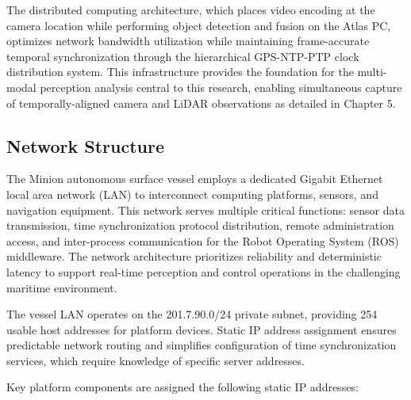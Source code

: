 \documentclass{erauthesis}
\begin{document}
The distributed computing architecture, which places video encoding at the camera location while performing object detection and fusion on the Atlas PC, optimizes network bandwidth utilization while maintaining frame-accurate temporal synchronization through the hierarchical GPS-NTP-PTP clock distribution system. This infrastructure provides the foundation for the multi-modal perception analysis central to this research, enabling simultaneous capture of temporally-aligned camera and LiDAR observations as detailed in Chapter 5.

\subsection{Network Structure} \label{comp:network}


The Minion autonomous surface vessel employs a dedicated Gigabit Ethernet local area network (LAN) to interconnect computing platforms, sensors, and navigation equipment. This network serves multiple critical functions: sensor data transmission, time synchronization protocol distribution, remote administration access, and inter-process communication for the Robot Operating System (ROS) middleware. The network architecture prioritizes reliability and deterministic latency to support real-time perception and control operations in the challenging maritime environment.


The vessel LAN operates on the 201.7.90.0/24 private subnet, providing 254 usable host addresses for platform devices. Static IP address assignment ensures predictable network routing and simplifies configuration of time synchronization services, which require knowledge of specific server addresses. 

Key platform components are assigned the following static IP addresses:

\end{document}
